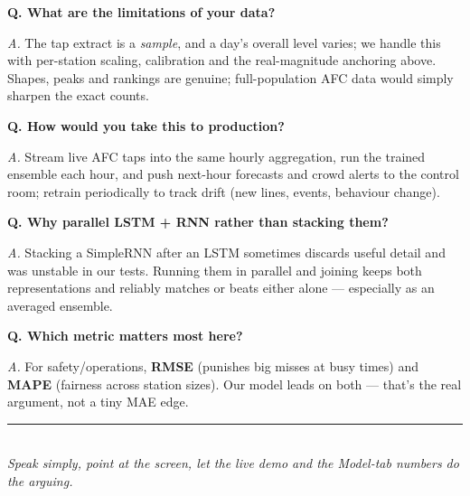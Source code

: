 \documentclass[11pt]{article}
\newcommand{\q}[1]{\medskip\noindent\textbf{Q. #1}\par\nopagebreak}
\newcommand{\an}[1]{\noindent\textit{A.} #1\par}
\begin{document}
\q{What are the limitations of your data?}
\an{The tap extract is a \emph{sample}, and a day's overall level varies; we handle this with
per-station scaling, calibration and the real-magnitude anchoring above. Shapes, peaks and rankings
are genuine; full-population AFC data would simply sharpen the exact counts.}
\q{How would you take this to production?}
\an{Stream live AFC taps into the same hourly aggregation, run the trained ensemble each hour, and push
next-hour forecasts and crowd alerts to the control room; retrain periodically to track drift (new
lines, events, behaviour change).}
\q{Why parallel LSTM + RNN rather than stacking them?}
\an{Stacking a SimpleRNN after an LSTM sometimes discards useful detail and was unstable in our tests.
Running them in parallel and joining keeps both representations and reliably matches or beats either
alone --- especially as an averaged ensemble.}
\q{Which metric matters most here?}
\an{For safety/operations, \textbf{RMSE} (punishes big misses at busy times) and \textbf{MAPE}
(fairness across station sizes). Our model leads on both --- that's the real argument, not a tiny MAE edge.}

\bigskip
\begin{center}\small\color{ink}\rule{0.4\textwidth}{0.8pt}\\[4pt]
\textit{Speak simply, point at the screen, let the live demo and the Model-tab numbers do the arguing.}
\end{center}
\end{document}
